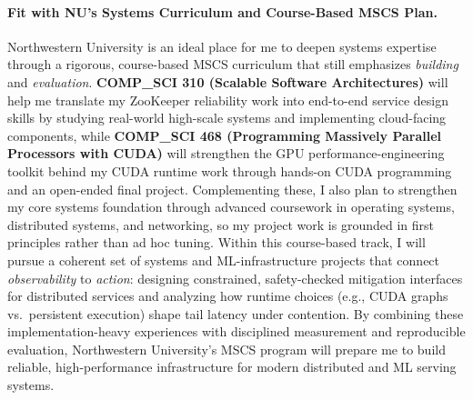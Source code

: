 \documentclass{article}
\newcommand{\schoolShort}{NU\xspace}
\newcommand{\school}{Northwestern University\xspace}
\begin{document}
\paragraph{Fit with \schoolShort's Systems Curriculum and Course-Based MSCS Plan.}
\school is an ideal place for me to deepen systems expertise through a rigorous, course-based MSCS curriculum that still emphasizes \emph{building} and \emph{evaluation}.
\textbf{COMP\_SCI 310 (Scalable Software Architectures)} will help me translate my ZooKeeper reliability work into end-to-end service design skills by studying real-world high-scale systems and implementing cloud-facing components, while \textbf{COMP\_SCI 468 (Programming Massively Parallel Processors with CUDA)} will strengthen the GPU performance-engineering toolkit behind my CUDA runtime work through hands-on CUDA programming and an open-ended final project.
Complementing these, I also plan to strengthen my core systems foundation through advanced coursework in operating systems, distributed systems, and networking, so my project work is grounded in first principles rather than ad hoc tuning.
Within this course-based track, I will pursue a coherent set of systems and ML-infrastructure projects that connect \emph{observability} to \emph{action}: designing constrained, safety-checked mitigation interfaces for distributed services and analyzing how runtime choices (e.g., CUDA graphs vs.\ persistent execution) shape tail latency under contention.
By combining these implementation-heavy experiences with disciplined measurement and reproducible evaluation, \school's MSCS program will prepare me to build reliable, high-performance infrastructure for modern distributed and ML serving systems.
\end{document}

